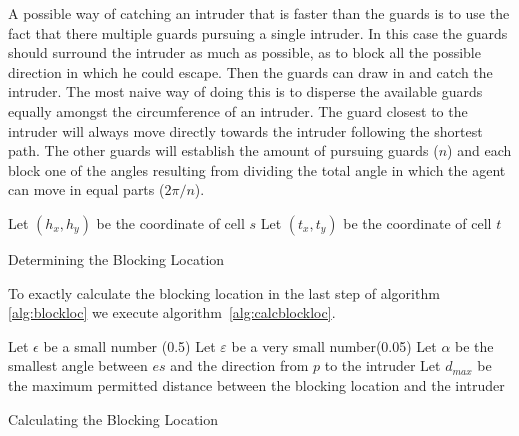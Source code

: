 A possible way of catching an intruder that is faster than the guards is to use the fact that there multiple guards pursuing a single intruder. In this case the guards should surround the intruder as much as possible, as to block all the possible direction in which he could escape. Then the guards can draw in and catch the intruder. The most naive way of doing this is to disperse the available guards equally amongst the circumference of an intruder. The guard closest to the intruder will always move directly towards the intruder following the shortest path. The other guards will establish the amount of pursuing guards ($n$) and each block one of the angles resulting from dividing the total angle in which the agent can move in equal parts ($2\pi / n$).


			\begin{algorithm}[H]
			Let $(h_x,h_y)$ be the coordinate of cell $s$\;
			Let $(t_x,t_y)$ be the coordinate of cell $t$\;
			\label{alg:blockloc}
			\caption{Determining the Blocking Location}
			\end{algorithm}

			To exactly calculate the blocking location in the last step of algorithm \ref{alg:blockloc} we execute algorithm~\ref{alg:calcblockloc}.

			\begin{algorithm}[H]
				Let $\epsilon$ be a small number (0.5)\;
				Let $\varepsilon$ be a very small number(0.05)\; 
				Let $\alpha$ be the smallest angle between $es$ and the direction from $p$ to the intruder\;
				Let $d_{max}$ be the maximum permitted distance between the blocking location and the intruder\;
				\label{alg:calcblockloc}
				\caption{Calculating the Blocking Location}
			\end{algorithm}
